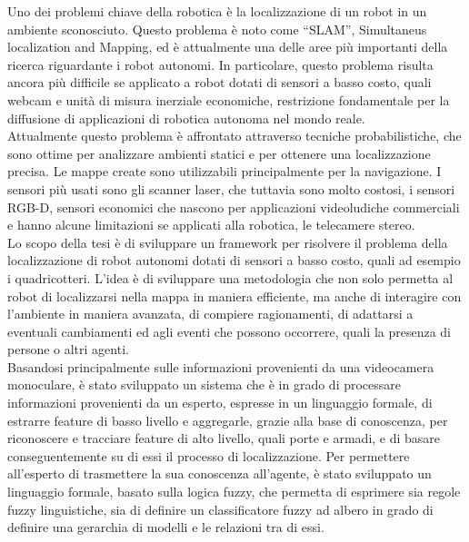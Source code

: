 Uno dei problemi chiave della robotica è la localizzazione di un robot in un ambiente sconosciuto. Questo problema è noto come ``SLAM'', Simultaneus localization and Mapping, ed è attualmente una delle aree più importanti della ricerca riguardante i robot autonomi. 
In particolare, questo problema risulta ancora più difficile se applicato a robot dotati di sensori a basso costo, quali webcam e unità di misura inerziale economiche, restrizione fondamentale per la diffusione di applicazioni di robotica autonoma nel mondo reale. \\
Attualmente questo problema è affrontato attraverso tecniche probabilistiche, che sono ottime per analizzare ambienti statici e per ottenere una localizzazione precisa. Le mappe create sono utilizzabili principalmente per la navigazione.
I sensori più usati sono gli scanner laser, che tuttavia sono molto costosi, i sensori RGB-D, sensori economici che nascono per applicazioni videoludiche commerciali e hanno alcune limitazioni se applicati alla robotica, le telecamere stereo. \\
Lo scopo della tesi è di sviluppare un framework per risolvere il problema della localizzazione di robot autonomi dotati di sensori a basso costo, quali ad esempio i quadricotteri. L'idea è di sviluppare una metodologia che non solo permetta al robot di localizzarsi nella mappa in maniera efficiente, ma anche di interagire con l'ambiente in maniera avanzata, di compiere ragionamenti, di adattarsi a eventuali cambiamenti ed agli eventi che possono occorrere, quali la presenza di persone o altri agenti. \\
Basandosi principalmente sulle informazioni provenienti da una videocamera monoculare, è stato sviluppato un sistema che è in grado di processare informazioni provenienti da un esperto, espresse in un linguaggio formale, di estrarre feature di basso livello e aggregarle, grazie alla base di conoscenza, per riconoscere e tracciare feature di alto livello, quali porte e armadi, e di basare conseguentemente su di essi il processo di localizzazione.
Per permettere all'esperto di trasmettere la sua conoscenza all'agente, è stato sviluppato un linguaggio formale, basato sulla logica fuzzy, che permetta di esprimere sia regole fuzzy linguistiche, sia di definire un classificatore fuzzy ad albero in grado di definire una gerarchia di modelli e le relazioni tra di essi. \\

